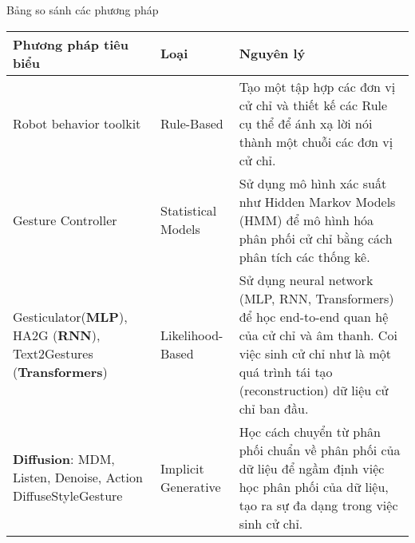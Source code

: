 \begin{frame}{Bảng so sánh các phương pháp}
\begin{table}[h!]
	\footnotesize
	\centering
	\renewcommand{\arraystretch}{1.5} %
	\begin{tabular}{|p{}|p{}|p{}|}
		\hline
		\textbf{Phương pháp tiêu biểu} & \textbf{Loại} & \textbf{Nguyên lý} \\ \hline
		Robot behavior toolkit & Rule-Based & Tạo một tập hợp các đơn vị cử chỉ và thiết kế các Rule cụ thể để ánh xạ lời nói thành một chuỗi các đơn vị cử chỉ. \\ \hline
		Gesture Controller & Statistical Models & Sử dụng mô hình xác suất như Hidden Markov Models (HMM) để mô hình hóa phân phối cử chỉ bằng cách phân tích các thống kê. \\ \hline
		Gesticulator(\textbf{MLP}), HA2G (\textbf{RNN}), Text2Gestures (\textbf{Transformers}) & Likelihood-Based & Sử dụng neural network  (MLP, RNN, Transformers) để học end-to-end quan hệ của cử chỉ và âm thanh. Coi việc sinh cử chỉ như là một quá trình tái tạo (reconstruction) dữ liệu cử chỉ ban đầu. \\ \hline
		\textbf{Diffusion}: MDM, Listen, Denoise, Action
		DiffuseStyleGesture & Implicit Generative & Học cách chuyển từ phân phối chuẩn về phân phối của dữ liệu để ngầm định việc học phân phối của dữ liệu, tạo ra sự đa dạng trong việc sinh cử chỉ. \\ \hline
	\end{tabular}
\end{table}


\end{frame}

